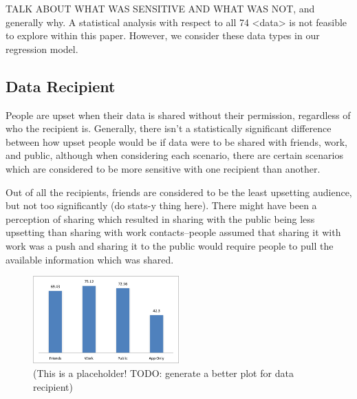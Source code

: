 \documentclass{acm_proc_article-sp}
\begin{document}
TALK ABOUT WHAT WAS SENSITIVE AND WHAT WAS NOT, and generally why. A statistical analysis with respect to all 74 <data> is not feasible to explore within this paper. However, we consider these data types in our regression model.  

\subsection{Data Recipient}
People are upset when their data is shared without their permission, regardless of who the recipient is. Generally, there isn't a statistically significant difference between how upset people would be if data were to be shared with friends, work, and public, although when considering each scenario, there are certain scenarios which are considered to be more sensitive with one recipient than another.

Out of all the recipients, friends are considered to be the least upsetting audience, but not too significantly (do stats-y thing here). There might have been a perception of sharing which resulted in sharing with the public being less upsetting than sharing with work contacts--people assumed that sharing it with work was a push and sharing it to the public would require people to pull the available information which was shared.

\begin{figure}
	\centering
	\includegraphics[width=0.5\textwidth]{recipient.png}
	\caption{(This is a placeholder! TODO: generate a better plot for data recipient)}
\end{figure}

\end{document}

